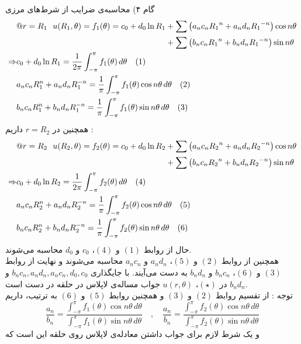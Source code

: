 گام ۴) محاسبه‌ی ضرایب از شرط‌های مرزی
\[\begin{aligned}
	& \begin{aligned}
		@ r=R_1 \ \ u(R_1,\theta)=f_1(\theta)
		=c_0+d_0\ln {R_1}& +\sum\left(a_nc_n{R_1}^n+a_nd_n{R_1}^{-n}\right)\cos{n\theta}
		\\ &
		+\sum\left(b_nc_n{R_1}^n+b_nd_n{R_1}^{-n}\right)\sin{n\theta}
	\end{aligned}
	\\ \Rightarrow &
	c_0+d_0\ln{R_1}=\frac1{2\pi}\int_{-\pi}^\pi f_1(\theta)\,d\theta \quad (1)
	\\ &
	a_nc_nR_1^n+a_nd_nR_1^{-n}=\frac1\pi\int_{-\pi}^\pi f_1(\theta)\cos{n\theta}\,d\theta \quad (2)
	\\ &
	b_nc_nR_1^n+b_nd_nR_1^{-n}=\frac1\pi\int_{-\pi}^\pi f_1(\theta)\sin{n\theta}\,d\theta \quad (3)
\end{aligned}\]
همچنین در
$r=R_2$
داریم :
\[\begin{aligned}
	& \begin{aligned}
		@ r=R_2 \ \ u(R_2,\theta)=f_2(\theta)
		=c_0+d_0\ln {R_2}& +\sum\left(a_nc_n{R_2}^n+a_nd_n{R_2}^{-n}\right)\cos{n\theta}
		\\ &
		+\sum\left(b_nc_n{R_2}^n+b_nd_n{R_2}^{-n}\right)\sin{n\theta}
	\end{aligned}
	\\ \Rightarrow &
	c_0+d_0\ln{R_2}=\frac1{2\pi}\int_{-\pi}^\pi f_2(\theta)\,d\theta \quad (4)
	\\ &
	a_nc_nR_2^n+a_nd_nR_2^{-n}=\frac1\pi\int_{-\pi}^\pi f_2(\theta)\cos{n\theta}\,d\theta \quad (5)
	\\ &
	b_nc_nR_2^n+b_nd_nR_2^{-n}=\frac1\pi\int_{-\pi}^\pi f_2(\theta)\sin{n\theta}\,d\theta \quad (6)
\end{aligned}\]
حال از روابط
$(1)$
و
$(4)$،
$c_0$
و
$d_0$
محاسبه می‌شوند.\\
همچنین از روابط
$(2)$
و
$(5)$،
$a_nd_n$
و
$a_nc_n$
محاسبه می‌شوند و نهایت از روابط
$(3)$
و
$(6)$،
$b_nc_n$
و
$b_nd_n$
به دست می‌آیند. با جایگذاری
$b_nc_n,a_nd_n,a_nc_n,d_0,c_0$
و
$b_nd_n$
در
$(\star)$،
$u(r,\theta)$
جواب مساله‌ی لاپلاس در حلقه در دست است.\\
توجه : از تقسیم روابط
$(2)$
و
$(3)$
و همچنین روابط
$(5)$
و
$(6)$
به ترتیب، داریم
\[
\frac{a_n}{b_n}=\frac{\int_{-\pi}^\pi f_1(\theta)\cos{n\theta}\,d\theta}{\int_{-\pi}^\pi f_1(\theta)\sin{n\theta}\,d\theta} \quad , \quad\frac{a_n}{b_n}=\frac{\int_{-\pi}^\pi f_2(\theta)\cos{n\theta}\,d\theta}{\int_{-\pi}^\pi f_2(\theta)\sin{n\theta}\,d\theta}
\]
و یک شرط لازم برای جواب داشتن معادله‌ی لاپلاس روی حلقه این است که
